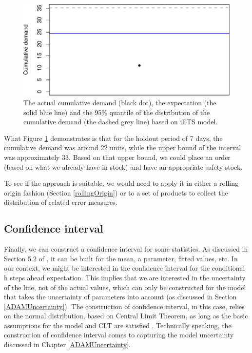 \documentclass[
]{book}
\theoremstyle{definition}
\theoremstyle{definition}
\theoremstyle{definition}
\theoremstyle{definition}
\theoremstyle{remark}
\begin{document}
\begin{figure}
\centering
\includegraphics{Svetunkov--2022----ADAM_files/figure-latex/adamModeliETSCumulative-1.pdf}
\caption{\label{fig:adamModeliETSCumulative}The actual cumulative demand (black dot), the expectation (the solid blue line) and the 95\% quantile of the distribution of the cumulative demand (the dashed grey line) based on iETS model.}
\end{figure}

What Figure \ref{fig:adamModeliETSCumulative} demonstrates is that for the holdout period of 7 days, the cumulative demand was around 22 units, while the upper bound of the interval was approximately 33. Based on that upper bound, we could place an order (based on what we already have in stock) and have an appropriate safety stock.

To see if the approach is suitable, we would need to apply it in either a rolling origin fashion (Section \ref{rollingOrigin}) or to a set of products to collect the distribution of related error measures.

\hypertarget{confidence-interval}{%
\subsection{Confidence interval}\label{confidence-interval}}

Finally, we can construct a confidence interval for some statistics. As discussed in Section 5.2 of \citet{SvetunkovSBA}, it can be built for the mean, a parameter, fitted values, etc. In our context, we might be interested in the confidence interval for the conditional h steps ahead expectation. This implies that we are interested in the uncertainty of the line, not of the actual values, which can only be constructed for the model that takes the uncertainty of parameters into account (as discussed in Section \ref{ADAMUncertainty}). The construction of confidence interval, in this case, relies on the normal distribution, based on Central Limit Theorem, as long as the basic assumptions for the model and CLT are satisfied \citep[see Section 4.2 and Chapter 12 of][]{SvetunkovSBA}. Technically speaking, the construction of confidence interval comes to capturing the model uncertainty discussed in Chapter \ref{ADAMUncertainty}.
\end{document}
